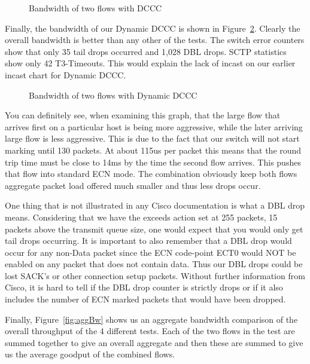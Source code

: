 \documentclass[12pt]{article}
\begin{document}
\begin{figure}[h]
\centering
{}
\caption{Bandwidth of two flows with DCCC}
\label{fig:dcccBw}
\end{figure}

\newpage

Finally, the bandwidth of our Dynamic DCCC is shown in Figure~\ref{fig:dynBw}. Clearly the
overall bandwidth is better than any other of the tests. The switch error counters show that only 35 tail
drops occurred and 1,028 DBL drops. SCTP statistics show only 42 T3-Timeouts. This would explain
the lack of incast on our earlier incast chart for Dynamic DCCC.

\begin{figure}[h]
\centering
{}
\caption{Bandwidth of two flows with Dynamic DCCC}
\label{fig:dynBw}
\end{figure}

You can definitely see, when examining this graph, that the large flow that arrives first on a particular
host is being more aggressive, while the later arriving large flow is less aggressive. This is due to
the fact that our switch will not start marking until 130 packets. At about 115us per packet this means
that the round trip time must be close to 14ms by the time the second flow arrives. This pushes that
flow into standard ECN mode. The combination obviously keep both flows aggregate packet load
offered much smaller and thus less drops occur.

One thing that is not illustrated in any Cisco documentation is what a DBL drop means. Considering
that we have the exceeds action set at 255 packets, 15 packets above the transmit queue size, one
would expect that you would only get tail drops occurring.  It is important to also remember that a DBL 
drop would occur for any non-Data packet since the ECN code-point ECT0 would NOT be enabled on any packet that
does not contain data. Thus our DBL drops could be lost SACK's or other connection setup packets.
Without further information from Cisco, it is hard to tell if the DBL drop counter is strictly drops or
if it also includes the number of ECN marked packets that would have been dropped.


Finally, Figure~\ref{fig:aggBw}  shows us an aggregate bandwidth comparison of the 
overall throughput of the 4 different tests. Each of the two flows in the test are summed
together to give an overall aggregate and then these are summed to give us the average
goodput of the combined flows.
\end{document}
